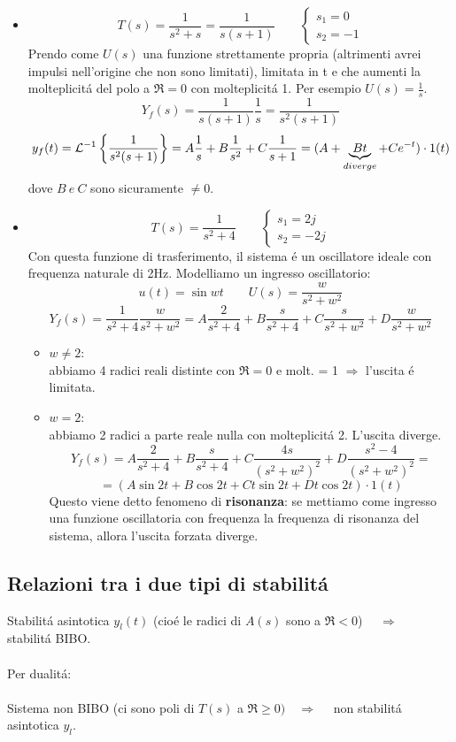 \documentclass[../main.tex]{subfiles}
\begin{document}
	\begin{itemize}
		\item 
		\[ T(s) = \frac{1}{s^2+s} = \frac{1}{s(s+1)} \qquad \begin{cases} s_1 = 0\\ s_2 = -1 \end{cases} \]
		Prendo come $ U(s) $ una funzione strettamente propria (altrimenti avrei impulsi nell'origine che non sono limitati), limitata in t e che aumenti la molteplicit\'{a} del polo a $ \Re = 0 $ con molteplicit\'{a} 1. Per esempio $ U(s) = \frac{1}{s} $.
		\[ Y_f(s) = \frac{1}{s(s+1)}\frac{1}{s} = \frac{1}{s^2(s+1)}\]
		\[ y_f(t) = \mathcal{L}^{-1} \left\lbrace \frac{1}{s^2(s+1)} \right\rbrace = A\frac{1}{s} + B\frac{1}{s^2} + C\frac{1}{s+1} = (A + \underbrace{Bt}_{diverge} + Ce^{-t}) \cdot 1(t) \]
		dove $ B\ e\ C $ sono sicuramente $ \neq 0 $.
		\item
		\[ T(s) = \frac{1}{s^2+4} \qquad \begin{cases} s_1=2j\\ s_2=-2j \end{cases}\]
		Con questa funzione di trasferimento, il sistema \'{e} un oscillatore ideale con frequenza naturale di 2Hz.
		Modelliamo un ingresso oscillatorio:
		\[ u(t) = \sin wt \qquad U(s) = \frac{w}{s^2+w^2} \]
		\[ Y_f(s) = \frac{1}{s^2+4} \frac{w}{s^2+w^2} = A\frac{2}{s^2+4} + B\frac{s}{s^2+4} + C\frac{s}{s^2+w^2} + D\frac{w}{s^2+w^2}\]
		\begin{itemize}
			\item $ w \neq 2 $:\\
			abbiamo 4 radici reali distinte con $ \Re = 0 $ e molt. = 1 $ \Rightarrow $ l'uscita \'{e} limitata.
			\item $ w = 2 $:\\
			abbiamo 2 radici a parte reale nulla con molteplicit\'{a} 2. L'uscita diverge.
			\[ Y_f(s) = A\frac{2}{s^2+4} + B\frac{s}{s^2+4} + C\frac{4s}{(s^2+w^2)^2} + D\frac{s^2-4}{(s^2+w^2)^2} = \]
			\[ = (A \sin2t + B \cos 2t + Ct \sin2t + Dt \cos 2t) \cdot 1(t) \]
			Questo viene detto fenomeno di \textbf{risonanza}: se mettiamo come ingresso una funzione oscillatoria con frequenza la frequenza di risonanza del sistema, allora l'uscita forzata diverge.
		\end{itemize}
	\end{itemize}  
	\subsection{Relazioni tra i due tipi di stabilit\'{a}}
	Stabilit\'{a} asintotica $ y_l(t) $ (cio\'{e} le radici di $ A(s) $ sono a $ \Re < 0 $) $ \quad \Rightarrow \quad $ stabilit\'{a} BIBO.\\
	\smallskip\\
	Per dualit\'{a}:\\
	\smallskip\\
	Sistema non BIBO (ci sono poli di $ T(s) $ a $ \Re \geq 0) \quad \Rightarrow \quad $ non stabilit\'{a} asintotica $ y_l $.
\end{document}
